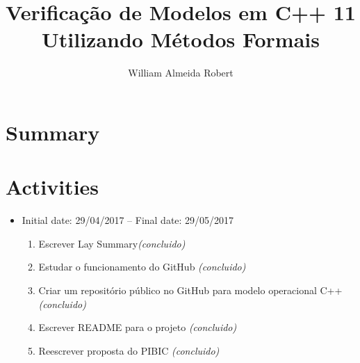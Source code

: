 \documentclass[11pt]{article}
\begin{document}
%
\author{William Almeida Robert}
\title{Verificação de Modelos em C++ 11 Utilizando Métodos Formais}
\maketitle

\section{Summary}


\section{Activities}

\begin{itemize}
	\item Initial date: 29/04/2017 -- Final date: 29/05/2017
	\begin{enumerate}
		\item Escrever Lay Summary{\it (concluido)}
		\item Estudar o funcionamento do GitHub {\it (concluido)}
		\item Criar um repositório público no GitHub para modelo operacional C++ {\it (concluido)}
		\item Escrever README para o projeto {\it (concluido)}
		\item Reescrever proposta do PIBIC {\it (concluido)}
	\end{enumerate}
	
\end{itemize}
\end{document}
